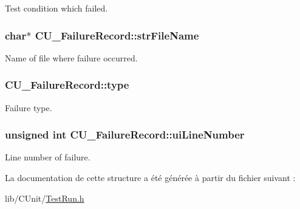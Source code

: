 Test condition which failed. 

\hypertarget{structCU__FailureRecord_a5b72f6fe23e35605545809f435884da3}{
\subsubsection[{str\-File\-Name}]{\setlength{\rightskip}{0pt plus 5cm}char$\ast$ C\-U\-\_\-\-Failure\-Record\-::str\-File\-Name}}\label{structCU__FailureRecord_a5b72f6fe23e35605545809f435884da3}


Name of file where failure occurred. 

\hypertarget{structCU__FailureRecord_a62a59280fc5faa1156fdfb7536704887}{
\subsubsection[{type}]{ C\-U\-\_\-\-Failure\-Record\-::type}}\label{structCU__FailureRecord_a62a59280fc5faa1156fdfb7536704887}


Failure type. 

\hypertarget{structCU__FailureRecord_a124d4ce97d29bae29f952250da03536b}{
\subsubsection[{ui\-Line\-Number}]{\setlength{\rightskip}{0pt plus 5cm}unsigned int C\-U\-\_\-\-Failure\-Record\-::ui\-Line\-Number}}\label{structCU__FailureRecord_a124d4ce97d29bae29f952250da03536b}


Line number of failure. 



La documentation de cette structure a été générée à partir du fichier suivant \-:\begin{DoxyCompactItemize}
\item 
lib/\-C\-Unit/\hyperlink{TestRun_8h}{Test\-Run.\-h}\end{DoxyCompactItemize}
